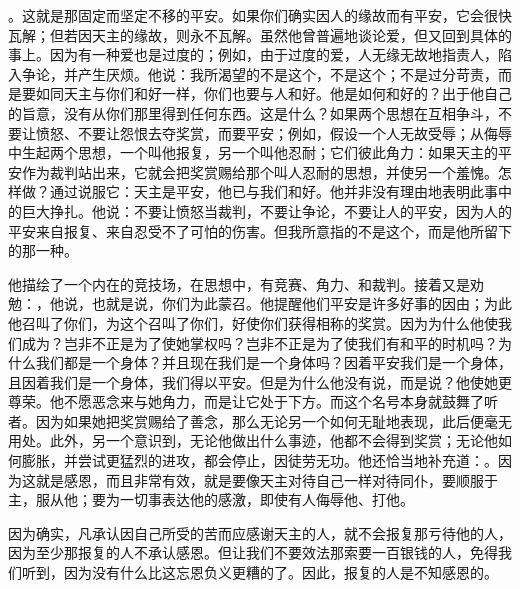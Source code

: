 。这就是那固定而坚定不移的平安。如果你们确实因人的缘故而有平安，它会很快瓦解；但若因天主的缘故，则永不瓦解。虽然他曾普遍地谈论爱，但又回到具体的事上。因为有一种爱也是过度的；例如，由于过度的爱，人无缘无故地指责人，陷入争论，并产生厌烦。他说：我所渴望的不是这个，不是这个；不是过分苛责，而是要如同天主与你们和好一样，你们也要与人和好。他是如何和好的？出于他自己的旨意，没有从你们那里得到任何东西。这是什么？如果两个思想在互相争斗，不要让愤怒、不要让怨恨去夺奖赏，而要平安；例如，假设一个人无故受辱；从侮辱中生起两个思想，一个叫他报复，另一个叫他忍耐；它们彼此角力：如果天主的平安作为裁判站出来，它就会把奖赏赐给那个叫人忍耐的思想，并使另一个羞愧。怎样做？通过说服它：天主是平安，他已与我们和好。他并非没有理由地表明此事中的巨大挣扎。他说：不要让愤怒当裁判，不要让争论，不要让人的平安，因为人的平安来自报复、来自忍受不了可怕的伤害。但我所意指的不是这个，而是他所留下的那一种。\par

他描绘了一个内在的竞技场，在思想中，有竞赛、角力、和裁判。接着又是劝勉：，他说，也就是说，你们为此蒙召。他提醒他们平安是许多好事的因由；为此他召叫了你们，为这个召叫了你们，好使你们获得相称的奖赏。因为为什么他使我们成为？岂非不正是为了使她掌权吗？岂非不正是为了使我们有和平的时机吗？为什么我们都是一个身体？并且现在我们是一个身体吗？因着平安我们是一个身体，且因着我们是一个身体，我们得以平安。但是为什么他没有说，而是说？他使她更尊荣。他不愿恶念来与她角力，而是让它处于下方。而这个名号本身就鼓舞了听者。因为如果她把奖赏赐给了善念，那么无论另一个如何无耻地表现，此后便毫无用处。此外，另一个意识到，无论他做出什么事迹，他都不会得到奖赏；无论他如何膨胀，并尝试更猛烈的进攻，都会停止，因徒劳无功。他还恰当地补充道：。因为这就是感恩，而且非常有效，就是要像天主对待自己一样对待同仆，要顺服于主，服从他；要为一切事表达他的感激，即使有人侮辱他、打他。\par

因为确实，凡承认因自己所受的苦而应感谢天主的人，就不会报复那亏待他的人，因为至少那报复的人不承认感恩。但让我们不要效法那索要一百银钱的人，免得我们听到，因为没有什么比这忘恩负义更糟的了。因此，报复的人是不知感恩的。\par

